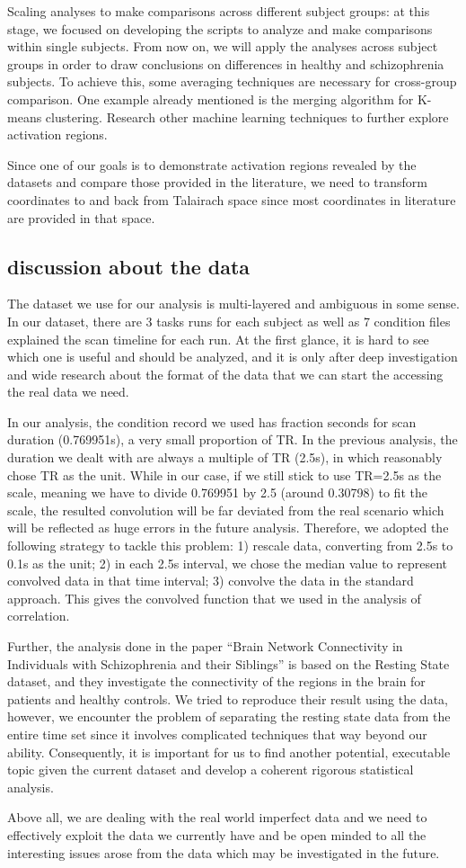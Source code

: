 \documentclass[11pt]{article}
\begin{document}
Scaling analyses to make comparisons across different subject groups: at this
stage, we focused on developing the scripts to analyze and make comparisons
within single subjects. From now on, we will apply the analyses across subject
groups in order to draw conclusions on differences in healthy and schizophrenia
subjects. To achieve this, some averaging techniques are necessary for
cross-group comparison. One example already mentioned is the merging algorithm
for K-means clustering. Research other machine learning techniques to further
explore activation regions.

Since one of our goals is to demonstrate activation regions revealed by the
datasets and compare those provided in the literature, we need to transform
coordinates to and back from Talairach space since most coordinates in
literature are provided in that space.

\subsection{discussion about the data}

The dataset we use for our analysis is multi-layered and ambiguous in some
sense. In our dataset, there are 3 tasks runs for each subject as well as 7
condition files explained the scan timeline for each run. At the first glance,
it is hard to see which one is useful and should be analyzed, and it is only
after deep investigation and wide research about the format of the data that we
can start the accessing the real data we need. 

In our analysis, the condition record we used has fraction seconds for scan
duration (0.769951s), a very small proportion of TR. In the previous analysis,
the duration we dealt with are always a multiple of TR (2.5s), in which
reasonably chose TR as the unit. While in our case, if we still stick to use
TR=2.5s as the scale, meaning we have to divide 0.769951 by 2.5 (around 0.30798)
to fit the scale, the resulted convolution will be far deviated from the real
scenario which will be reflected as huge errors in the future
analysis. Therefore, we adopted the following strategy to tackle this problem:
1) rescale data, converting from 2.5s to 0.1s as the unit; 2) in each 2.5s
interval, we chose the median value to represent convolved data in that time
interval; 3) convolve the data in the standard approach. This gives the
convolved function that we used in the analysis of correlation. 

Further, the analysis done in the paper  “Brain Network Connectivity in
Individuals with Schizophrenia and their Siblings” is based on the Resting State
dataset, and they investigate the connectivity of the regions in the brain for
patients and healthy controls. We tried to reproduce their result using the
data, however, we encounter the problem of separating the resting state data
from the entire time set since it involves complicated techniques that way
beyond our ability. Consequently, it is important for us to find another
potential, executable topic given the current dataset and develop a coherent
rigorous statistical analysis.

Above all, we are dealing with the real world imperfect data and we need to
effectively exploit the data we currently have and be open minded to all the
interesting issues arose from the data which may be investigated in the future.


\end{document}
